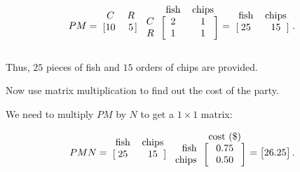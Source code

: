 \documentclass[../key.tex]{subfiles}
\begin{document}
$$PM = \begin{blockarray}{cc}
C & R \\
\begin{block}{[cc]}
10 & 5 \\
\end{block}
\end{blockarray}\begin{blockarray}{rcc}
& \text{fish} & \text{chips} \\
\begin{block}{r[cc]}
C & 2 & 1 \\
R & 1 & 1 \\
\end{block}
\end{blockarray} = \begin{blockarray}{cc}
\text{fish} & \text{chips} \\
\begin{block}{[cc]}
25 & 15 \\
\end{block}
\end{blockarray}.$$

Thus, $25$ pieces of fish and $15$ orders of chips are provided.

\begin{inner_problem}
\item Now use matrix multiplication to find out the cost of the party.
\end{inner_problem}

We need to multiply $PM$ by $N$ to get a $1\times 1$ matrix:

$$PMN = \begin{blockarray}{cc}
\text{fish} & \text{chips} \\
\begin{block}{[cc]}
25 & 15 \\
\end{block}
\end{blockarray}\begin{blockarray}{rc}
& \text{cost (\$)} \\
\begin{block}{r[c]}
\text{fish} & 0.75 \\
\text{chips} & 0.50 \\
\end{block}
\end{blockarray} = \begin{bmatrix}
26.25 \\
\end{bmatrix}.$$
\end{document}
